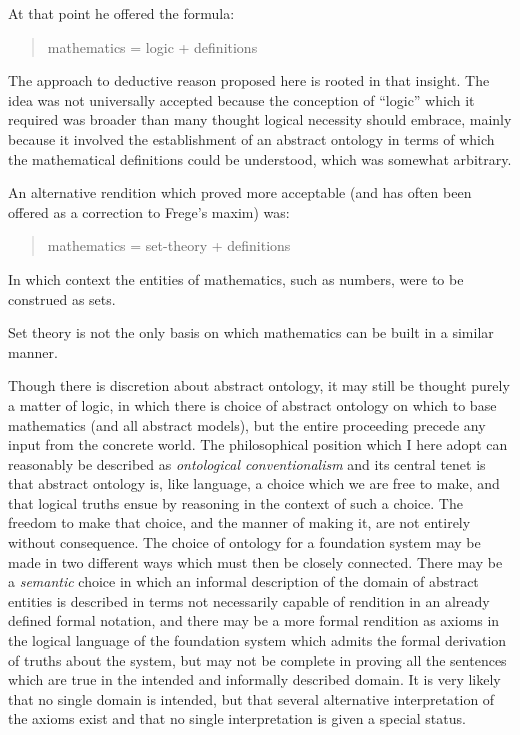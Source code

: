 \documentclass[10pt,titlepage]{article}
\begin{document}
At that point he offered the formula:

\begin{quote}
  mathematics = logic + definitions
\end{quote}

The approach to deductive reason proposed here is rooted in that insight.
The idea was not universally accepted because the conception of ``logic'' which it required was broader than many thought logical necessity should embrace, mainly because it involved the establishment of an abstract ontology in terms of which the mathematical definitions could be understood, which was somewhat arbitrary.

An alternative rendition which proved more acceptable (and has often been offered as a correction to Frege's maxim) was:

\begin{quote}
  mathematics = set-theory + definitions
\end{quote}

In which context the entities of mathematics, such as numbers, were to be construed as sets.

Set theory is not the only basis on which mathematics can be built in a similar manner.

Though there is discretion about abstract ontology, it may still be thought purely a matter of logic, in which there is choice of abstract ontology on which to base mathematics (and all abstract models), but the entire proceeding precede any input from the concrete world.
The philosophical position which I here adopt can reasonably be described as \emph{ontological conventionalism} and its central tenet is that abstract ontology is, like language, a choice which we are free to make, and that logical truths ensue by reasoning in the context of such a choice.
The freedom to make that choice, and the manner of making it, are not entirely without consequence.
The choice of ontology for a foundation system may be made in two different ways which must then be closely connected.
There may be a \emph{semantic} choice in which an informal description of the domain of abstract entities is described in terms not necessarily capable of rendition in an already defined formal notation, and there may be a more formal rendition as axioms in the logical language of the foundation system which admits the formal derivation of truths about the system, but may not be complete in proving all the sentences which are true in the intended and informally described domain.
It is very likely that no single domain is intended, but that several alternative interpretation of the axioms exist and that no single interpretation is given a special status.
\end{document}
